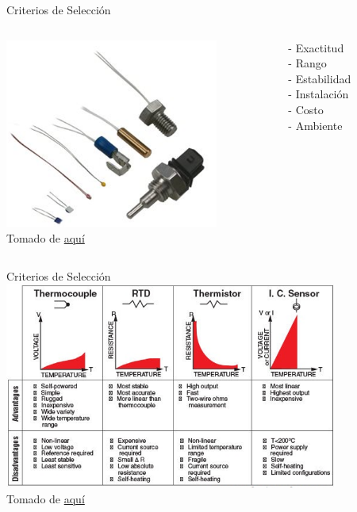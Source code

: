 \documentclass[aspectratio=169]{beamer}
\begin{document}
\begin{frame}{Criterios de Selección}
 \begin{columns}[c, onlytextwidth]
        \begin{column}{0.40\textwidth}
        \centering
            \includegraphics[width=7cm]{fig/Criteria Sensor.PNG}
            \\ \tiny{Tomado de \href{https://www.variohm.com/news-media/technical-blog-archive/selecting-temperature-sensor-things-to-consider}{aquí}}
        \end{column}
        \begin{column}{0.50\textwidth}
               \centering
        {- Exactitud \\
        - Rango \\
        - Estabilidad \\
        - Instalación\\
        - Costo\\
        - Ambiente
        }
        \end{column}
    \end{columns}
\end{frame}
\begin{frame}{Criterios de Selección}
    \centering
    \includegraphics[width=11cm]{fig/Selection_Sensor.PNG}
            \\ \tiny{Tomado de \href{https://www.mechaterrain.com/lm35-temperature-sensor}{aquí}}
\end{frame}
\end{document}
